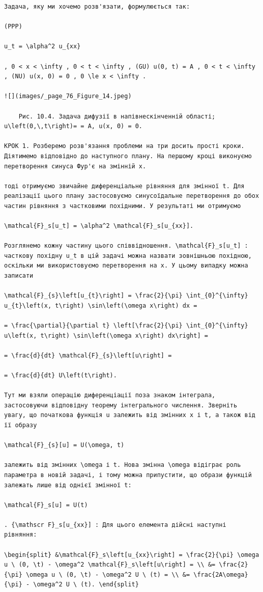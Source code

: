 \documentclass[
  ukrainian,
]{article}
\begin{document}
\begin{verbatim}
Задача, яку ми хочемо розв'язати, формулюється так:

(PPP)

u_t = \alpha^2 u_{xx}

, 0 < x < \infty , 0 < t < \infty , (GU) u(0, t) = A , 0 < t < \infty , (NU) u(x, 0) = 0 , 0 \le x < \infty .

![](images/_page_76_Figure_14.jpeg)

    Рис. 10.4. Задача дифузії в напівнескінченній області; u\left(0,\,t\right)= = A, u(x, 0) = 0.

КРОК 1. Розберемо розв'язання проблеми на три досить прості кроки. Діятимемо відповідно до наступного плану. На першому кроці виконуємо перетворення синуса Фур'є на змінній x.

тоді отримуємо звичайне диференціальне рівняння для змінної t. Для реалізації цього плану застосовуємо синусоїдальне перетворення до обох частин рівняння з частковими похідними. У результаті ми отримуємо

\mathcal{F}_s[u_t] = \alpha^2 \mathcal{F}_s[u_{xx}].

Розглянемо кожну частину цього співвідношення. \mathcal{F}_s[u_t] : часткову похідну u_t в цій задачі можна назвати зовнішньою похідною, оскільки ми використовуємо перетворення на x. У цьому випадку можна записати

\mathcal{F}_{s}\left[u_{t}\right] = \frac{2}{\pi} \int_{0}^{\infty} u_{t}\left(x, t\right) \sin\left(\omega x\right) dx =

= \frac{\partial}{\partial t} \left[\frac{2}{\pi} \int_{0}^{\infty} u\left(x, t\right) \sin\left(\omega x\right) dx\right] =

= \frac{d}{dt} \mathcal{F}_{s}\left[u\right] =

= \frac{d}{dt} U\left(t\right).

Тут ми взяли операцію диференціації поза знаком інтеграла, застосовуючи відповідну теорему інтегрального числення. Зверніть увагу, що початкова функція u залежить від змінних x і t, а також від її образу

\mathcal{F}_{s}[u] = U(\omega, t)

залежить від змінних \omega і t. Нова змінна \omega відіграє роль параметра в новій задачі, і тому можна припустити, що образи функцій залежать лише від однієї змінної t:

\mathcal{F}_s[u] = U(t)

. {\mathscr F}_s[u_{xx}] : Для цього елемента дійсні наступні рівняння:

\begin{split} &\mathcal{F}_s\left[u_{xx}\right] = \frac{2}{\pi} \omega u \ (0, \t) - \omega^2 \mathcal{F}_s\left[u\right] = \\ &= \frac{2}{\pi} \omega u \ (0, \t) - \omega^2 U \ (t) = \\ &= \frac{2A\omega}{\pi} - \omega^2 U \ (t). \end{split}


\end{verbatim}
\end{document}
